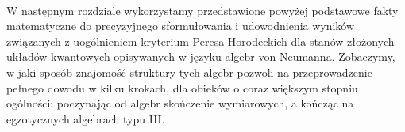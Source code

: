 \paragraph{}
W następnym rozdziale wykorzystamy przedstawione powyżej podstawowe fakty
matematyczne do precyzyjnego sformułowania i udowodnienia wyników związanych
z uogólnieniem kryterium Peresa-Horodeckich dla stanów złożonych układów
kwantowych opisywanych w języku algebr von Neumanna.
Zobaczymy,
w jaki sposób znajomość struktury tych algebr pozwoli na przeprowadzenie
pełnego dowodu w kilku krokach, dla obieków o coraz większym stopniu ogólności:
poczynając od algebr skończenie wymiarowych,
a kończąc na egzotycznych algebrach typu III.


% 


\paragraph{}

